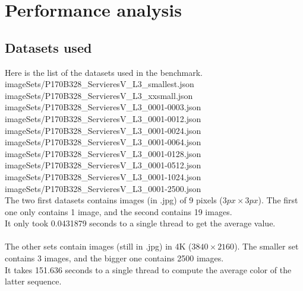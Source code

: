 \section{Performance analysis}
\subsection{Datasets used}
Here is the list of the datasets used in the benchmark.
imageSets/P170B328\_ServieresV\_L3\_smallest.json\\
imageSets/P170B328\_ServieresV\_L3\_xxsmall.json\\
imageSets/P170B328\_ServieresV\_L3\_0001-0003.json\\
imageSets/P170B328\_ServieresV\_L3\_0001-0012.json\\
imageSets/P170B328\_ServieresV\_L3\_0001-0024.json\\
imageSets/P170B328\_ServieresV\_L3\_0001-0064.json\\
imageSets/P170B328\_ServieresV\_L3\_0001-0128.json\\
imageSets/P170B328\_ServieresV\_L3\_0001-0512.json\\
imageSets/P170B328\_ServieresV\_L3\_0001-1024.json\\
imageSets/P170B328\_ServieresV\_L3\_0001-2500.json\\

The two first datasets contains images (in .jpg) of 9 pixels ($3px \times 3px$). The first one only contains 1 image, and the second contains 19 images.\\
It only took 0.0431879 seconds to a single thread to get the average value.\\
\\
The other sets contain images (still in .jpg) in 4K ($3840 \times 2160$). The smaller set contains 3 images, and the bigger one contains 2500 images.\\
It takes 151.636 seconds to a single thread to compute the average color of the latter sequence.\\

